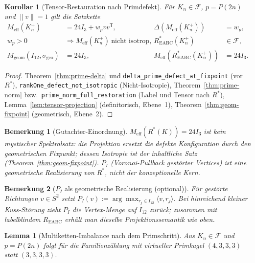\documentclass[11pt,a4paper]{article}
\newtheorem{remark}{Bemerkung}
\newtheorem{lemma}{Lemma}
\newtheorem{corollary}{Korollar}
\begin{document}
\begin{corollary}[Tensor-Restauration nach Primdefekt]
\label{cor:tensor-restore}
Für $K_n\in\mathcal{F}$, $p=P(2n)$ und $\|v\|=1$ gilt die Satzkette
\begin{align*}
  M_{\mathrm{eff}}(K_n^+) &= 24I_3+w_pvv^{\mathsf T},
  & \Delta(M_{\mathrm{eff}}(K_n^+)) &= w_p,
  \\
  w_p>0 &\Rightarrow M_{\mathrm{eff}}(K_n^+)\ \text{nicht isotrop},
  & R^*_{\mathrm{EABC}}(K_n^+) &\in \mathcal{F},
  \\
  M_{\mathrm{geom}}(I_{12},\sigma_{\mathrm{geo}}) &= 24I_3,
  &
  M_{\mathrm{eff}}(R^*_{\mathrm{EABC}}(K_n^+)) &= 24I_3.
\end{align*}
\end{corollary}

\begin{proof}
Theorem~\ref{thm:prime-delta} und \texttt{delta\_prime\_defect\_at\_fixpoint}
(vor $R^*$),
\texttt{rankOne\_defect\_not\_isotropic} (Nicht-Isotropie),
Theorem~\ref{thm:prime-norm} bzw.\ \texttt{prime\_norm\_full\_restoration}
(Label und Tensor nach $R^*$),
Lemma~\ref{lem:tensor-projection} (definitorisch, Ebene~1),
Theorem~\ref{thm:geom-fixpoint} (geometrisch, Ebene~2).
\end{proof}

\begin{remark}[Gutachter-Einordnung]
$M_{\mathrm{eff}}(R^*(K))=24I_3$ ist \emph{kein} mystischer Spektralsatz:
die Projektion ersetzt die defekte Konfiguration durch den geometrischen Fixpunkt;
dessen Isotropie ist der inhaltliche Satz (Theorem~\ref{thm:geom-fixpoint}).
$P_I$ (Voronoi-Pullback gestörter Vertices) ist eine geometrische Realisierung
von $R^*$, nicht der konzeptionelle Kern.
\end{remark}

\begin{remark}[$P_I$ als geometrische Realisierung (optional)]
\label{rem:pi-optional}
Für gestörte Richtungen $v\in S^2$ setzt
$P_I(v):=\arg\max_{r_j\in I_{12}}\langle v,r_j\rangle$.
Bei hinreichend kleiner Kuss-Störung zieht $P_I$ die Vertex-Menge auf $I_{12}$
zurück; zusammen mit labelblindem $R_{\mathrm{EABC}}$ erhält man dieselbe
Projektionssemantik wie oben.
\end{remark}

\begin{lemma}[Multiketten-Imbalance nach dem Primschritt]
\label{lem:prime-imbalance}
Aus $K_n\in\mathcal{F}$ und $p=P(2n)$ folgt für die Familienzählung mit virtueller
Primkugel $(4,3,3,3)$ statt $(3,3,3,3)$.
\end{lemma}
\end{document}
